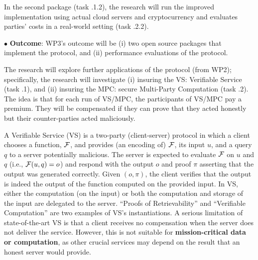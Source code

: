  In the second package (task \3.1.2), the research will run the improved implementation using actual cloud servers and cryptocurrency and evaluates parties' costs in a real-world setting (task \3.2.2). 




 \noindent$\bullet$\textbf{ Outcome}: WP3's outcome will be (i) two open source packages that implement the protocol, and (ii) performance evaluations of the protocol. %
 
 
\vs
\noindent{}

\vs

 The research will explore further applications of the protocol (from WP2); specifically, the research will investigate (i) insuring the VS: Verifiable Service (task \4.1), and (ii) insuring the MPC: secure Multi-Party Computation (task \4.2). The idea is that for each run of VS/MPC, the participants of  VS/MPC pay a premium. They will be compensated if they can prove that they acted honestly but their counter-parties acted maliciously. 
 
 
A Verifiable Service (VS) is a two-party (client-server) protocol in which a client chooses a function, $\mathcal{F}$,
and provides (an encoding of) $\mathcal{F}$, its input $u$, and a query $q$ to a server potentially malicious. The server is expected to evaluate
$\mathcal{F}$ on $u$ and $q$ (i.e., $\mathcal{F}(u, q)=o$) and respond with the output $o$ and proof $\pi$ asserting that the output was generated correctly. Given $(o, \pi)$, the client verifies that the output is indeed the output of the function computed on the provided input. In VS, either the
computation (on the input) or both the computation and storage of the input are delegated to the server. ``Proofs of Retrievability''  and  ``Verifiable Computation'' are two examples of VS's instantiations. A serious limitation of state-of-the-art VS is that a client receives no compensation when the server does not deliver the service. However, this is not suitable for \textbf{mission-critical data or computation}, as other crucial services may depend on the result that an honest server would provide. 

